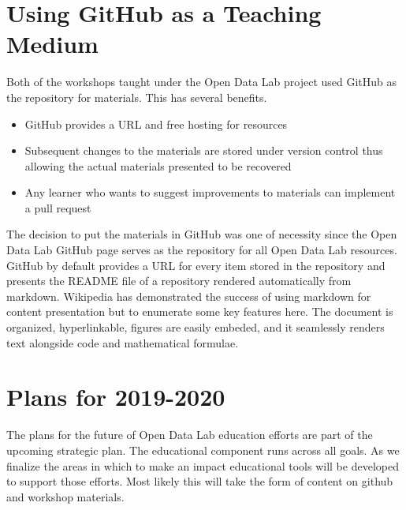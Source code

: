 \section{Using GitHub as a Teaching Medium}
\label{githubforteaching}
Both of the workshops taught under the Open Data Lab project used GitHub as the repository for materials. This has several benefits.
\begin{itemize}
\item GitHub provides a URL and free hosting for resources
\item Subsequent changes to the materials are stored under version control thus allowing the actual materials presented to be recovered
\item Any learner who wants to suggest improvements to materials can implement a pull request
\end{itemize}

The decision to put the materials in GitHub was one of necessity since the Open Data Lab GitHub page serves as the repository for all Open Data Lab resources. GitHub by default provides a URL for every item stored in the repository and presents the README file of a repository  rendered automatically from markdown. Wikipedia has demonstrated the success of using markdown for content presentation but to enumerate some key features here. The document is organized, hyperlinkable, figures are easily embeded, and it seamlessly renders text alongside code and mathematical formulae.

\section{Plans for 2019-2020}
The plans for the future of Open Data Lab education efforts are part of the upcoming strategic plan. The educational component runs across all goals. As we finalize the areas in which to make an impact educational tools will be developed to support those efforts. Most likely this will take the form of content on github and workshop materials.